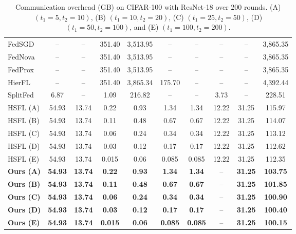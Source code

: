 \documentclass[letterpaper]{article} %
\begin{document}
\begin{table}
\begin{tabular}{l|cccccccc|c}
        FedSGD & -- & -- & 351.40 & 3,513.95 & -- & -- & -- & -- & 3,865.35 \\
        FedNova & -- & -- & 351.40 & 3,513.95 & -- & -- & -- & -- & 3,865.35 \\
        FedProx & -- & -- & 351.40 & 3,513.95 & -- & -- & -- & -- & 3,865.35 \\ \hline
        HierFL & -- & -- & 351.40 & 3,865.34 & 175.70 & -- & -- & -- & 4,392.44 \\ \hline
        SplitFed & 6.87 & -- & 1.09 & 216.82 & -- & -- & 3.73 & -- & 228.51 \\ \hline
        HSFL (A) & 54.93 & 13.74 & 0.22 & 0.93 & 1.34 & 1.34 & 12.22 & 31.25 & 115.97 \\
        HSFL (B) & 54.93 & 13.74 & 0.11 & 0.48 & 0.67 & 0.67 & 12.22 & 31.25 & 114.07 \\
        HSFL (C) & 54.93 & 13.74 & 0.06 & 0.24 & 0.34 & 0.34 & 12.22 & 31.25 & 113.12 \\
        HSFL (D) & 54.93 & 13.74 & 0.03 & 0.12 & 0.17 & 0.17 & 12.22 & 31.25 & 112.62 \\
        HSFL (E) & 54.93 & 13.74 & 0.015 & 0.06 & 0.085 & 0.085 & 12.22 & 31.25 & 112.35 \\ \hline
        \textbf{Ours (A)} & \textbf{54.93} & \textbf{13.74} & \textbf{0.22} & \textbf{0.93} & \textbf{1.34} & \textbf{1.34} & -- & \textbf{31.25} & \textbf{103.75} \\
        \textbf{Ours (B)} & \textbf{54.93} & \textbf{13.74} & \textbf{0.11} & \textbf{0.48} & \textbf{0.67} & \textbf{0.67} & -- & \textbf{31.25} & \textbf{101.85} \\
        \textbf{Ours (C)} & \textbf{54.93} & \textbf{13.74} & \textbf{0.06} & \textbf{0.24} & \textbf{0.34} & \textbf{0.34} & -- & \textbf{31.25} & \textbf{100.90} \\
        \textbf{Ours (D)} & \textbf{54.93} & \textbf{13.74} & \textbf{0.03} & \textbf{0.12} & \textbf{0.17} & \textbf{0.17} & -- & \textbf{31.25} & \textbf{100.40} \\
        \textbf{Ours (E)} & \textbf{54.93} & \textbf{13.74} & \textbf{0.015} & \textbf{0.06} & \textbf{0.085} & \textbf{0.085} & -- & \textbf{31.25} & \textbf{100.15} \\
        \hline
        \end{tabular}
        \caption{Communication overhead (GB) on CIFAR-100 with ResNet-18 over 200 rounds. 
        (A) $(t_1=5, t_2=10)$, (B) $(t_1=10, t_2=20)$, (C) $(t_1=25, t_2=50)$, (D) $(t_1=50, t_2=100)$, and (E) $(t_1=100, t_2=200)$.}
        \label{tab:comm_overhead_extended}
    \end{table}
\end{document}
